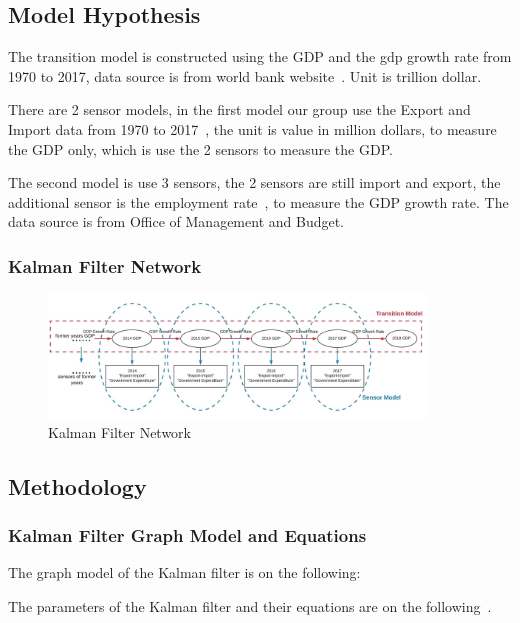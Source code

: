 \documentclass[11pt, a4paper]{article}
\begin{document}
\subsection{Model Hypothesis}
The transition model is constructed using the GDP and the gdp growth rate from 1970 to 2017, data source is from world bank website~\cite{ref:source1}. Unit is trillion dollar.

There are 2 sensor models, in the first model our group use the Export and Import data from 1970 to 2017~\cite{ref:source2}, the unit is value in million dollars, to measure the GDP only, which is use the 2 sensors to measure the GDP. 

The second model is use 3 sensors, the 2 sensors are still import and export, the additional sensor is the employment rate~\cite{ref:source3}, to measure the GDP growth rate. The data source is from Office of Management and Budget. 

\subsubsection{Kalman Filter Network}

\begin{figure}[htbp]
	
	\centering 
	\includegraphics[width=10cm]{graph}
	
	\caption{Kalman Filter Network}
	\label{fig:network}
	
\end{figure}


\subsection{Methodology}

\subsubsection{Kalman Filter Graph Model and Equations}
The graph model of the Kalman filter is on the following:



The parameters of the Kalman filter and their equations are on the following~\cite{ref:kf}.
\end{document}
